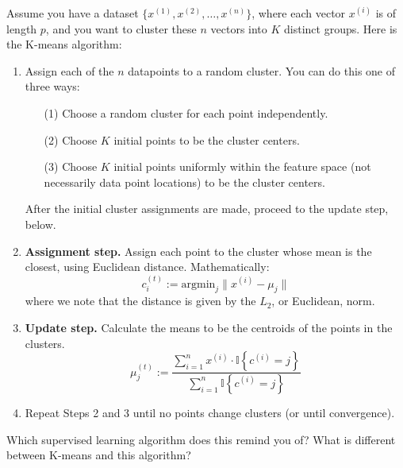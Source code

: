 Assume you have a dataset $\{ x^{(1)}, x^{(2)}, \dots, x^{(n)} \}$, where each vector $x^{(i)}$ is of length $p$, and you want to cluster these $n$ vectors into $K$ distinct groups. Here is the K-means algorithm:
\begin{enumerate}
\item Assign each of the $n$ datapoints to a random cluster. You can do this one of three ways: 
	\begin{enumerate}
	\item[(1)] Choose a random cluster for each point independently. 
	\item[(2)] Choose $K$ initial points to be the cluster centers.
	\item[(3)] Choose $K$ initial points uniformly within the feature space (not necessarily data point locations) to be the cluster centers. 
	\end{enumerate}
	After the initial cluster assignments are made, proceed to the update step, below.
\item \textbf{Assignment step.} Assign each point to the cluster whose mean is the closest, using Euclidean distance. Mathematically:
$$ c_i^{(t)} := \text{argmin}_j \| x^{(i)} - \mu_j \| $$
where we note that the distance is given by the $L_2$, or Euclidean, norm.
\item \textbf{Update step.} Calculate the means to be the centroids of the points in the clusters.
$$ \mu_j^{(t)} := \frac{\sum_{i=1}^n x^{(i)} \cdot \mathbb{I} \left\{ c^{(i)} = j \right\}}{\sum_{i=1}^n \mathbb{I} \left\{ c^{(i)} = j \right\}} $$
\item Repeat Steps 2 and 3 until no points change clusters (or until convergence). 
\end{enumerate}

\vspace{3mm}

\begin{question}{}
Which supervised learning algorithm does this remind you of? What is different between K-means and this algorithm?
\end{question}


